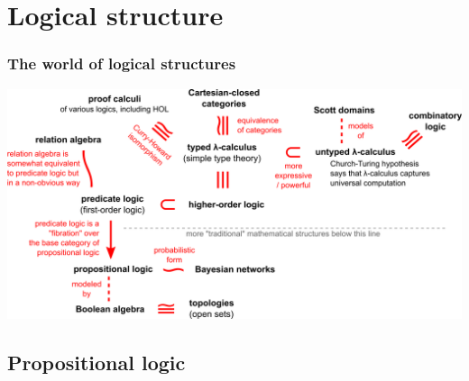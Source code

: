 \documentclass{beamer}
\begin{document}
\section{Logical structure}

\frame{\sectionpage}

\begin{frame}
\frametitle{The world of logical structures}
\includegraphics[scale=0.4]{world-of-logical-structures.png}
\end{frame}

\subsection{Propositional logic}

\frame{\subsectionpage}
\end{document}
